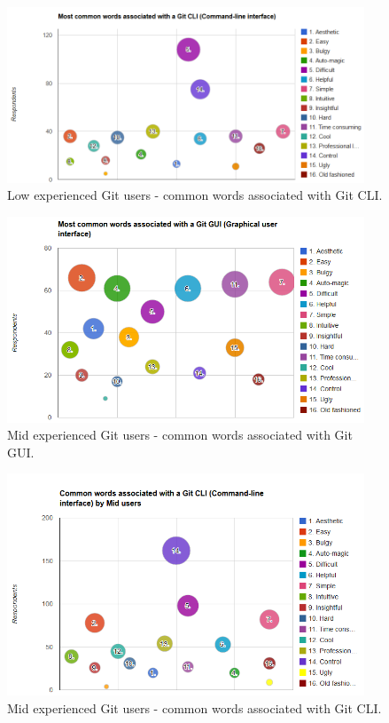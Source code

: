 \documentclass[a4paper,oneside]{bth} %
\begin{document}
				\begin{figure}[H]
					\centering
					\includegraphics[width=0.95\textwidth]{graphs/common-words-low-users-cli.png}
					\caption{Low experienced Git users - common words associated with Git CLI.}
					\label{fig:Low users - common words associated with Git CLI.}
				\end{figure}
				\begin{figure}[H]
					\centering
					\includegraphics[width=0.95\textwidth]{graphs/common-words-mid-users-gui.png}
					\caption{Mid experienced Git users - common words associated with Git GUI.}
					\label{fig:Mid users - common words associated with Git GUI.}
				\end{figure}
				\begin{figure}[H]
					\centering
					\includegraphics[width=0.95\textwidth]{graphs/common-words-mid-users-cli.png}
					\caption{Mid experienced Git users - common words associated with Git CLI.}
					\label{fig:Mid users - common words associated with Git CLI.}
				\end{figure}
\end{document}
